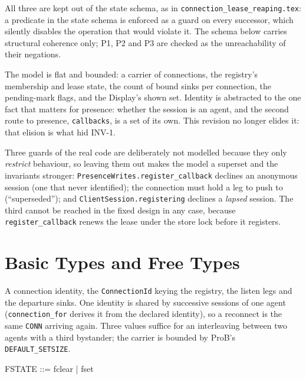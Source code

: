 \documentclass[a4paper,10pt,fleqn]{article}
\begin{document}
All three are kept out of the state schema, as in
\texttt{connection\_lease\_reaping.tex}: a predicate in the state schema is
enforced as a guard on every successor, which silently disables the
operation that would violate it. The schema below carries structural
coherence only; P1, P2 and P3 are checked as the unreachability of their
negations.

The model is flat and bounded: a carrier of connections, the registry's
membership and lease state, the count of bound sinks per connection, the
pending-mark flags, and the Display's shown set. Identity is abstracted to
the one fact that matters for presence: whether the session is an agent, and
the second route to presence, \texttt{callbacks}, is a set of its own. This
revision no longer elides it: that elision is what hid INV-1.

Three guards of the real code are deliberately not modelled because they only
\emph{restrict} behaviour, so leaving them out makes the model a superset and
the invariants stronger: \texttt{PresenceWrites.register\_callback} declines an
anonymous session (one that never identified); the connection must hold a leg
to push to (``superseded''); and \texttt{ClientSession.registering}
declines a \emph{lapsed} session. The third cannot be reached in the fixed
design in any case, because \texttt{register\_callback} renews the lease under
the store lock before it registers.

\section{Basic Types and Free Types}

\begin{zed}
  [CONN]
\end{zed}

A connection identity, the \texttt{ConnectionId} keying the registry, the
listen legs and the departure sinks. One identity is shared by successive
sessions of one agent (\texttt{connection\_for} derives it from the declared
identity), so a reconnect is the same \texttt{CONN} arriving again. Three
values suffice for an interleaving between two agents with a third bystander;
the carrier is bounded by ProB's \texttt{DEFAULT\_SETSIZE}.

\begin{zed}
  FSTATE ::= fclear | fset
\end{zed}
\end{document}
